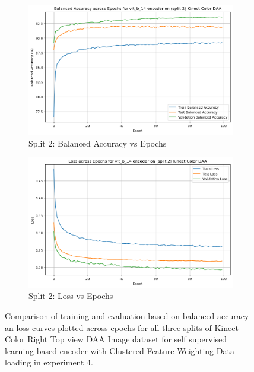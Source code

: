 \begin{figure}[htbp]
    \begin{subfigure}[b]{0.45\textwidth}
        \includegraphics[width=\textwidth]{Images_Thesis/Tensboard_runs_images_all/Experiment_03_Sel_Sup_D_B_no_Aug/Split_2/output_bal_acc_split_2_d_b_ssl.png}
        \caption{Split 2: Balanced Accuracy vs Epochs}
        \label{fig:Exp_4_05}
    \end{subfigure}
    \hfill
    \begin{subfigure}[b]{0.45\textwidth}
        \includegraphics[width=\textwidth]{Images_Thesis/Tensboard_runs_images_all/Experiment_03_Sel_Sup_D_B_no_Aug/Split_2/output_loss_split_2_d_b_ssl.png}
        \caption{Split 2: Loss vs Epochs}
        \label{fig:Exp_4_06}
    \end{subfigure}
    \caption[Results of Experiment 4: Self Supervised Learning Based Encoder with Clustered Feature Weighting Data-loading]{Comparison of training and evaluation based on balanced accuracy an loss curves plotted across epochs for all three splits of Kinect Color Right Top view DAA Image dataset for self supervised learning based encoder with Clustered Feature Weighting Data-loading in experiment 4.}
    \label{fig:Exp_4_00}
\end{figure}

